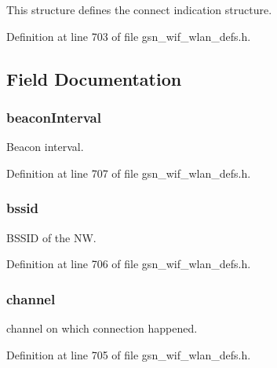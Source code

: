 This structure defines the connect indication structure. 

Definition at line 703 of file gsn\_\-wif\_\-wlan\_\-defs.h.



\subsection{Field Documentation}
\hypertarget{a00373_a54a6c03695574d9381214937f9dc6d57}{
\subsubsection[{beaconInterval}]{ {\bf beaconInterval}}}
\label{a00373_a54a6c03695574d9381214937f9dc6d57}
Beacon interval. 

Definition at line 707 of file gsn\_\-wif\_\-wlan\_\-defs.h.

\hypertarget{a00373_a1d70c2c8895c2763bdede85266c38318}{
\subsubsection[{bssid}]{ {\bf bssid}}}
\label{a00373_a1d70c2c8895c2763bdede85266c38318}
BSSID of the NW. 

Definition at line 706 of file gsn\_\-wif\_\-wlan\_\-defs.h.

\hypertarget{a00373_a52d69a3bd7bdfdfc6f9e40f4962c575d}{
\subsubsection[{channel}]{ {\bf channel}}}
\label{a00373_a52d69a3bd7bdfdfc6f9e40f4962c575d}
channel on which connection happened. 

Definition at line 705 of file gsn\_\-wif\_\-wlan\_\-defs.h.


